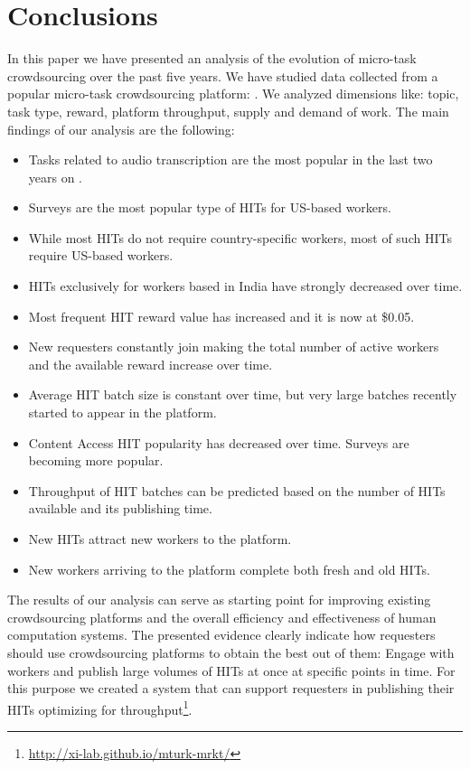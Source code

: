 \section{Conclusions}\label{sec:conc}

In this paper we have presented an analysis of the evolution of micro-task crowdsourcing over the past five years.
We have studied data collected from a popular micro-task crowdsourcing platform: \amt{}.
We analyzed dimensions like: topic, task type, reward, platform throughput, supply and demand of work.
The main findings of our analysis are the following:
\begin{itemize}[noitemsep,topsep=0pt,parsep=0pt,partopsep=0pt]
	\item Tasks related to audio transcription are the most popular in the last two years on \amt{}.
	\item Surveys are the most popular type of HITs for US-based workers.
	\item While most HITs do not require country-specific workers, most of such HITs require US-based workers.
	\item HITs exclusively for workers based in India have strongly decreased over time.
	\item Most frequent HIT reward value has increased and it is now at \$0.05.
	\item New requesters constantly join \amt{} making the total number of active workers and the available reward increase over time.
	\item Average HIT batch size is constant over time, but very large batches recently started to appear in the platform.
	\item Content Access HIT popularity has decreased over time. Surveys are becoming more popular.
	\item Throughput of HIT batches can be predicted based on the number of HITs available   and its publishing time.
	\item New HITs attract new workers to the platform.
	\item New workers arriving to the platform complete both fresh and old HITs.
\end{itemize}

The results of our analysis can serve as starting point for improving existing crowdsourcing platforms and the overall efficiency and effectiveness of human computation systems. The presented evidence clearly indicate how requesters should use crowdsourcing platforms to obtain the best out of them: Engage with workers and publish large volumes of HITs at once at specific points in time. For this purpose we created a system that can support requesters in publishing their HITs optimizing for throughput\footnote{\url{http://xi-lab.github.io/mturk-mrkt/}}.
